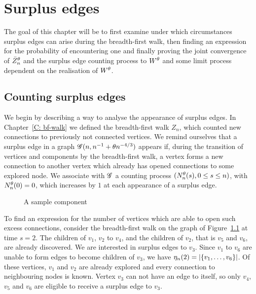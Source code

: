 
\chapter{Surplus edges} \label{C: surplus edges}

The goal of this chapter will be to first examine under which circumstances surplus edges can arise during the breadth-first walk,
then finding an expression for the probability of encountering one 
and finally proving the joint convergence of $\bar{Z}^{\theta}_n$ and the surplus edge counting process to $W^{\theta}$ and some limit process dependent on the realisation of $W^{\theta}$.


\section{Counting surplus edges}

We begin by describing a way to analyse the appearance of surplus edges.
In Chapter~\ref{C: bf-walk} we defined the breadth-first walk $Z_n$, 
which counted new connections to previously not connected vertices.
We remind ourselves that a surplus edge in a graph $\mathscr{G}(n, n^{-1} + \theta n^{-4/3})$ appears if,
during the transition of vertices and components by the breadth-first walk,
a vertex forms a new connection to another vertex
which already has opened connections to some explored node.
We associate with $\mathscr{G}$ a counting process $(N_n^{\theta}(s), 0 \leq s \leq n)$, \label{I: nnt}
with $N_n^{\theta}(0) = 0$, which increases by $1$ at each appearance of a surplus edge.

\begin{figure}[h]
	\centering
	\scalebox{0.85}{
		
	}
	\caption{A sample component} 
	\label{F: Surplus Edges Tree}
\end{figure}

To find an expression for the number of vertices which are able to open such excess connections, 
consider the breadth-first walk on the graph of Figure~\ref{F: Surplus Edges Tree} at time $s=2$.
The children of $v_1$, $v_2$ to $v_4$, and the children of $v_2$, that is $v_5$ and $v_6$, are already discovered.
We are interested in surplus edges to $v_3$.
Since $v_1$ to $v_6$ are unable to form edges to become children of $v_3$, we have $\eta_n(2) = |\{ v_1, \dots,  v_6\}|$.
Of these vertices, $v_1$ and $v_2$ are already explored and every connection to neighbouring nodes is known.
Vertex $v_3$ can not have an edge to itself, so only $v_4$, $v_5$ and $v_6$ are eligible to receive a surplus edge to $v_3$.

